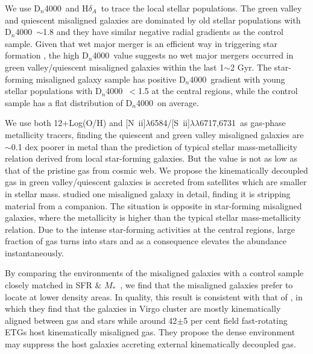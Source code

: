 \documentclass[a4paper,fleqn,usenatbib]{mnras}
\newcommand{\mstar}{$M_*$}
\newcommand{\dindex}{D$_n$4000}
\newcommand{\hd}{H$\delta$}
\newcommand{\hda}{\hd$_A$}
\newcommand{\ewhae}{\rm{EQW$_{\rm H\alpha}$}}
\newcommand{\nii}{[{N~\sc ii}]$\lambda$6584}
\newcommand{\sii}{[{S~\sc ii}]$\lambda\lambda$6717,6731}
\begin{document}

We use \dindex\ and \hda\ to trace the local stellar populations.
The green valley and quiescent misaligned galaxies are dominated by old stellar populations with \dindex\ $\sim$1.8 and they have similar negative radial gradients as the control sample. Given that wet major merger is an efficient way in triggering star formation \citep{veilleux-2002,springel-2005a,kormendy-1992}, the high \dindex\ value suggests no wet major mergers occurred in green valley/quiescent misaligned galaxies within the last 1$\sim$2 Gyr. The star-forming misaligned galaxy sample has positive \dindex\ gradient with young stellar populations with \dindex\ $<$1.5 at the central regions, while the control sample has a flat distribution of \dindex\ on average.

We use both 12+Log(O/H) and \nii/\sii\ as gas-phase metallicity tracers, finding the quiescent and green valley misaligned galaxies are $\sim$0.1 dex poorer in metal than the prediction of typical stellar mass-metallicity relation derived from local star-forming galaxies. But the value is not as low as that of the pristine gas from cosmic web. We propose the kinematically decoupled gas in green valley/quiescent galaxies is accreted from satellites which are smaller in stellar mass. %
\cite{cheung-2016} studied one misaligned galaxy in detail, finding it is stripping material from a companion. The situation is opposite in star-forming misaligned galaxies, where the metallicity is higher than the typical stellar mass-metallicity relation. Due to the intense star-forming activities at the central regions, large fraction of gas turns into stars and as a consequence elevates the abundance instantaneously.

By comparing the environments of the misaligned galaxies with a control sample closely matched in SFR $\&$ \mstar\ , we find that the misaligned galaxies prefer to locate at lower density areas. In quality, this result is consistent with that of \cite{davis-2011}, in which they find that the galaxies in Virgo cluster are mostly kinematically aligned between gas and stars while around 42$\pm$5 per cent field fast-rotating ETGs host kinematically misaligned gas. They propose the dense environment may suppress the host galaxies accreting external kinematically decoupled gas. 
\end{document}
